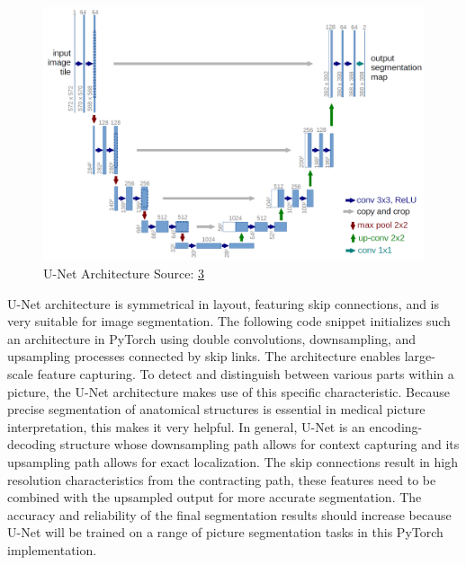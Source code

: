 \documentclass[11pt,a4paper]{article}
\begin{document}
\begin{figure}[H]
    \centering
    \includegraphics[width= 0.9\linewidth]{u-net-architecture.png}
    
    \caption{U-Net Architecture \newline \space Source: \href{https://lmb.informatik.uni-freiburg.de/people/ronneber/u-net/}{3}}
    
\end{figure}
\vspace{0.6cm}
U-Net architecture is symmetrical in layout, featuring skip connections, and is very suitable for image segmentation. The following code snippet initializes such an architecture in PyTorch using double convolutions, downsampling, and upsampling processes connected by skip links. The architecture enables large-scale feature capturing.
\vspace{0.2cm}
\linebreak
To detect and distinguish between various parts within a picture, the U-Net architecture makes use of this specific characteristic. Because precise segmentation of anatomical structures is essential in medical picture interpretation, this makes it very helpful. In general, U-Net is an encoding-decoding structure whose downsampling path allows for context capturing and its upsampling path allows for exact localization.
\vspace{0.2cm}
\linebreak
The skip connections result in high resolution characteristics from the contracting path, these features need to be combined with the upsampled output for more accurate segmentation. The accuracy and reliability of the final segmentation results should increase because U-Net will be trained on a range of picture segmentation tasks in this PyTorch implementation.
\end{document}
